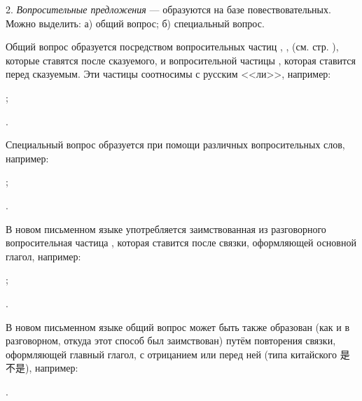 2. \emph{Вопросительные предложения} --- образуются на базе повествовательных. Можно выделить: а) общий вопрос; б) специальный вопрос.

Общий вопрос образуется посредством вопросительных частиц , ,  (см. стр. \pageref{sec:ss:soed_protiv}), которые ставятся после сказуемого, и вопросительной частицы , которая ставится перед сказуемым. Эти частицы соотносимы с русским <<ли>>, например:
\begin{prfsample}
	\item {};
	\item {}.
\end{prfsample}

Специальный вопрос образуется при помощи различных вопросительных слов, например:	
\begin{prfsample}
	\item {};
	\item {}.
\end{prfsample}

В новом письменном языке употребляется заимствованная из разговорного вопросительная частица , которая ставится после связки, оформляющей основной глагол, например:
\begin{prfsample}
	\item {};
	\item {}.
\end{prfsample}

В новом письменном языке общий вопрос может быть также образован (как и в разговорном, откуда этот способ был заимствован) путём повторения связки, оформляющей главный глагол, с отрицанием  или  перед ней (типа китайского {\chinfont 是不是}), например:
\begin{prfsample}
	\item {}.
\end{prfsample}

